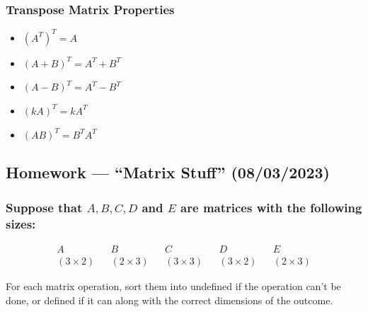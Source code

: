 \documentclass[
  letterpaper,
  DIV=11,
  numbers=noendperiod]{scrartcl}
\providecommand{\tightlist}{%
  \setlength{\itemsep}{0pt}\setlength{\parskip}{0pt}}\usepackage{longtable,booktabs,array}
\begin{document}
\subsubsection{Transpose Matrix
Properties}\label{transpose-matrix-properties}

\begin{itemize}
\tightlist
\item
  \((A^T)^T = A\)
\item
  \((A + B)^T = A^T + B^T\)
\item
  \((A - B)^T = A^T - B^T\)
\item
  \((kA)^T = kA^T\)
\item
  \((AB)^T = B^T A^T\)
\end{itemize}

\subsection{Homework --- ``Matrix Stuff''
(08/03/2023)}\label{homework-matrix-stuff-08032023}

\subsubsection{\texorpdfstring{Suppose that \(A, B, C, D\) and \(E\) are
matrices with the following
sizes:}{Suppose that A, B, C, D and E are matrices with the following sizes:}}\label{suppose-that-a-b-c-d-and-e-are-matrices-with-the-following-sizes}

\begin{align*}
&A& &B& &C& &D& &E& \\
&(3 \times 2)& &(2 \times 3)& &(3 \times 3)& &(3 \times 2)& &(2 \times 3)&
\end{align*}

For each matrix operation, sort them into undefined if the operation
can't be done, or defined if it can along with the correct dimensions of
the outcome.
\end{document}
